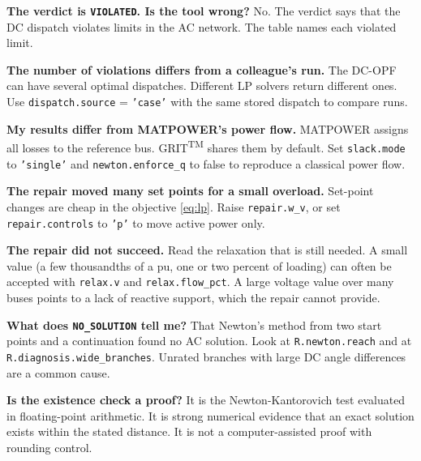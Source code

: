 \documentclass[a4paper,11pt]{article}
\newcommand{\TM}{\textsuperscript{TM}}
\newcommand{\GRIT}{GRIT\TM}
\newcommand{\opt}[1]{\texttt{#1}}
\begin{document}
\textbf{The verdict is \texttt{VIOLATED}. Is the tool wrong?} No. The verdict says that the DC dispatch violates limits in the AC network. The table names each violated limit.

\textbf{The number of violations differs from a colleague's run.} The DC-OPF can have several optimal dispatches. Different LP solvers return different ones. Use \opt{dispatch.source} = \texttt{'case'} with the same stored dispatch to compare runs.

\textbf{My results differ from MATPOWER's power flow.} MATPOWER assigns all losses to the reference bus. \GRIT{} shares them by default. Set \opt{slack.mode} to \texttt{'single'} and \opt{newton.enforce\_q} to false to reproduce a classical power flow.

\textbf{The repair moved many set points for a small overload.} Set-point changes are cheap in the objective \eqref{eq:lp}. Raise \opt{repair.w\_v}, or set \opt{repair.controls} to \texttt{'p'} to move active power only.

\textbf{The repair did not succeed.} Read the relaxation that is still needed. A small value (a few thousandths of a pu, one or two percent of loading) can often be accepted with \opt{relax.v} and \opt{relax.flow\_pct}. A large voltage value over many buses points to a lack of reactive support, which the repair cannot provide.

\textbf{What does \texttt{NO\_SOLUTION} tell me?} That Newton's method from two start points and a continuation found no AC solution. Look at \texttt{R.newton.reach} and at \texttt{R.diagnosis.wide\_branches}. Unrated branches with large DC angle differences are a common cause.

\textbf{Is the existence check a proof?} It is the Newton-Kantorovich test evaluated in floating-point arithmetic. It is strong numerical evidence that an exact solution exists within the stated distance. It is not a computer-assisted proof with rounding control.
\end{document}
